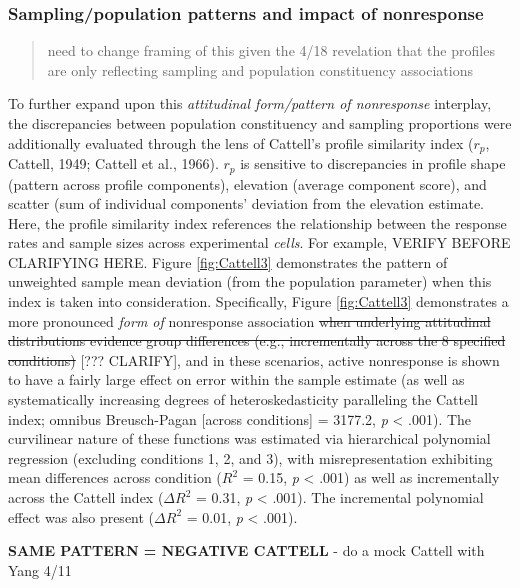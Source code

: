 \documentclass[
  man,mask]{apa7}
\begin{document}
\subsubsection{Sampling/population patterns and impact of nonresponse}\label{samplingpopulation-patterns-and-impact-of-nonresponse}

\begin{quote}
need to change framing of this given the 4/18 revelation that the profiles are only reflecting sampling and population constituency associations
\end{quote}

To further expand upon this \emph{attitudinal form/pattern of nonresponse} interplay, the discrepancies between population constituency and sampling proportions were additionally evaluated through the lens of Cattell's profile similarity index (\(r_p\), Cattell, 1949; Cattell et al., 1966). \(r_p\) is sensitive to discrepancies in profile shape (pattern across profile components), elevation (average component score), and scatter (sum of individual components' deviation from the elevation estimate. Here, the profile similarity index references the relationship between the response rates and sample sizes across experimental \emph{cells}. For example, VERIFY BEFORE CLARIFYING HERE. Figure \ref{fig:Cattell3} demonstrates the pattern of unweighted sample mean deviation (from the population parameter) when this index is taken into consideration. Specifically, Figure \ref{fig:Cattell3} demonstrates a more pronounced \emph{form of} nonresponse association \st{when underlying attitudinal distributions evidence group differences (e.g., incrementally across the 8 specified conditions)} {[}??? CLARIFY{]}, and in these scenarios, active nonresponse is shown to have a fairly large effect on error within the sample estimate (as well as systematically increasing degrees of heteroskedasticity paralleling the Cattell index; omnibus Breusch-Pagan {[}across conditions{]} = 3177.2, \emph{p} \textless{} .001). The curvilinear nature of these functions was estimated via hierarchical polynomial regression (excluding conditions 1, 2, and 3), with misrepresentation exhibiting mean differences across condition (\(R^2\) = 0.15, \emph{p} \textless{} .001) as well as incrementally across the Cattell index (\(\Delta{R^2}\) = 0.31, \emph{p} \textless{} .001). The incremental polynomial effect was also present (\(\Delta{R^2}\) = 0.01, \emph{p} \textless{} .001).

\textbf{SAME PATTERN = NEGATIVE CATTELL} - do a mock Cattell with Yang 4/11
\end{document}
